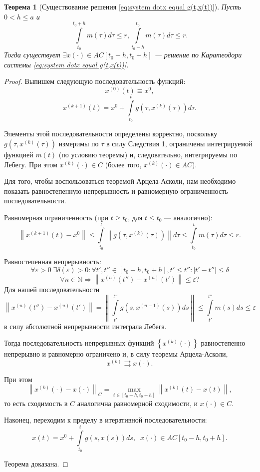 \documentclass[12pt, a4paper]{article}
\theoremstyle{rusdef}
\newtheorem{theorem}{Теорема}
\newcommand\abs[1]{\left\lvert #1 \right\rvert} %
\newcommand{\N}{\ensuremath{\mathbb{N}}} %
\newcommand{\norm}[1]{\left\lVert #1 \right\rVert} %
\begin{document}
\begin{theorem}[Существование решения \eqref{eq:system dotx equal g(t,x(t))}]
Пусть $0 < h \leqslant a$ и
$$
\int\limits_{t_0}^{t_0 + h} m(\tau) d\tau \leqslant r, \int\limits_{t_0 - h}^{t_0} m(\tau) d\tau \leqslant r.
$$
Тогда существует $\exists x(\cdot) \in AC[t_0 - h, t_0 + h]$ --- решение по Каратеодори системы \eqref{eq:system dotx equal g(t,x(t))}.
\end{theorem}
\begin{proof}
Выпишем следующую последовательность функций:
$$
x^{(0)}(t) \equiv x^0,
$$
$$
x^{(k+1)}(t) = x^0 + \int\limits_{t_0}^{t} g(\tau, x^{(k)}(\tau)) d\tau.
$$

Элементы этой последовательности определены корректно, поскольку $g(\tau, x^{(k)}(\tau))$ измеримы по $\tau$ в силу Следствия 1, ограничены интегрируемой функцией $m(t)$ (по условию теоремы) и, следовательно, интегрируемы по Лебегу. При этом $x^{(k)}(\cdot) \in C$ (более того, $x^{(k)}(\cdot) \in AC$).

Для того, чтобы воспользоваться теоремой Арцела-Асколи, нам необходимо показать равностепенную непрерывность и равномерную ограниченность последовательности.

Равномерная ограниченность (при $t \geqslant t_0$, для $t \leqslant t_0$ --- аналогично):
$$
\norm{x^{(k+1)}(t) - x^0} \leqslant \int\limits_{t_0}^{t} \norm{g(\tau, x^{(k)}(\tau))} d\tau \leqslant \int\limits_{t_0}^{t} m(\tau) d\tau \leqslant r.
$$

Равностепенная непрерывность:
$$
\forall \varepsilon >0 \; \exists \delta(\varepsilon) > 0 \colon \forall t', t'' \in [t_0 - h, t_0 + h], t' \leqslant t'' \colon \abs{t' - t''} \leqslant \delta
$$
$$
\forall n \in \N \Rightarrow \norm{ x^{(n)}(t'') - x^{(n)}(t')} \leqslant \varepsilon?
$$
Для нашей последовательности
$$
\norm{ x^{(n)}(t'') - x^{(n)}(t')} = \norm{\int\limits_{t'}^{t''} g(s, x^{(n-1)}(s))ds} \leqslant\int\limits_{t'}^{t''} m(s) ds \leqslant \varepsilon
$$
в силу абсолютной непрерывности интеграла Лебега.

Тогда последовательность непрерывных функций $\left\{ x^{(k)}(\cdot) \right\}$ равностепенно непрерывно и равномерно ограничено и, в силу теоремы Арцела-Асколи,
$$
x^{(k)} \rightrightarrows x(\cdot).
$$

При этом
$$
\norm{x^{(k)}(\cdot) - x(\cdot)}_C = \max\limits_{t \in [t_0 - h, t_0 + h]} \norm{x^{(k)}(t) - x(t)},
$$
то есть сходимость в $C$ аналогична равномерной сходимости, и $x(\cdot) \in C$.

Наконец, переходим к пределу в итеративной последовательности:
$$
x(t) = x^0 + \int\limits_{t_0}^{t} g(s, x(s)) ds, \;\; x(\cdot) \in AC[t_0 - h, t_0 + h].
$$

Теорема доказана.
\end{proof}
\end{document}

